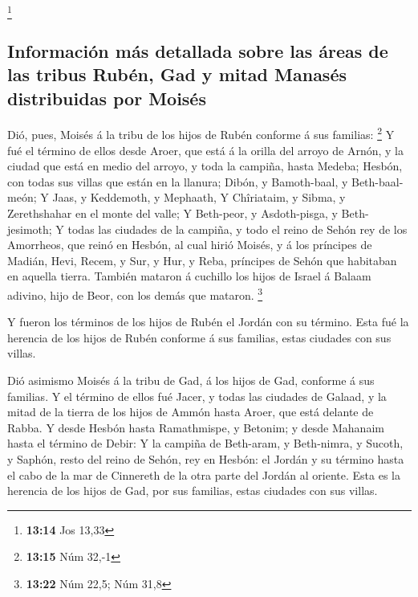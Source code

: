 \footnote{\textbf{13:14} Jos 13,33}

\hypertarget{informaciuxf3n-muxe1s-detallada-sobre-las-uxe1reas-de-las-tribus-rubuxe9n-gad-y-mitad-manasuxe9s-distribuidas-por-moisuxe9s}{%
\subsection{Información más detallada sobre las áreas de las tribus
Rubén, Gad y mitad Manasés distribuidas por
Moisés}\label{informaciuxf3n-muxe1s-detallada-sobre-las-uxe1reas-de-las-tribus-rubuxe9n-gad-y-mitad-manasuxe9s-distribuidas-por-moisuxe9s}}

 Dió, pues, Moisés á la tribu de los hijos de Rubén
conforme á sus familias: \footnote{\textbf{13:15} Núm 32,-1}
 Y fué el término de ellos desde Aroer, que está á la
orilla del arroyo de Arnón, y la ciudad que está en medio del arroyo, y
toda la campiña, hasta Medeba;  Hesbón, con todas sus
villas que están en la llanura; Dibón, y Bamoth-baal, y Beth-baal-meón;
 Y Jaas, y Keddemoth, y Mephaath,  Y
Chîriataim, y Sibma, y Zerethshahar en el monte del valle; 
Y Beth-peor, y Asdoth-pisga, y Beth-jesimoth;  Y todas las
ciudades de la campiña, y todo el reino de Sehón rey de los Amorrheos,
que reinó en Hesbón, al cual hirió Moisés, y á los príncipes de Madián,
Hevi, Recem, y Sur, y Hur, y Reba, príncipes de Sehón que habitaban en
aquella tierra.  También mataron á cuchillo los hijos de
Israel á Balaam adivino, hijo de Beor, con los demás que mataron.
\footnote{\textbf{13:22} Núm 22,5; Núm 31,8}

 Y fueron los términos de los hijos de Rubén el Jordán con
su término. Esta fué la herencia de los hijos de Rubén conforme á sus
familias, estas ciudades con sus villas.

 Dió asimismo Moisés á la tribu de Gad, á los hijos de Gad,
conforme á sus familias.  Y el término de ellos fué Jacer,
y todas las ciudades de Galaad, y la mitad de la tierra de los hijos de
Ammón hasta Aroer, que está delante de Rabba.  Y desde
Hesbón hasta Ramathmispe, y Betonim; y desde Mahanaim hasta el término
de Debir:  Y la campiña de Beth-aram, y Beth-nimra, y
Sucoth, y Saphón, resto del reino de Sehón, rey en Hesbón: el Jordán y
su término hasta el cabo de la mar de Cinnereth de la otra parte del
Jordán al oriente.  Esta es la herencia de los hijos de
Gad, por sus familias, estas ciudades con sus villas.

